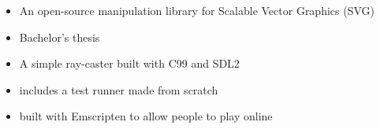\documentclass[10pt,a4paper,ragged2e,withhyper]{altacv}
\begin{document}
\begin{paracol}{2}
	\bigskip
	\medskip

	\divider

	\bigskip

	\begin{itemize}
		\item An open-source manipulation library for Scalable Vector Graphics (SVG)
		\item Bachelor's thesis
	\end{itemize}

	\divider

	\begin{itemize}
		\item A simple ray-caster built with C99 and SDL2
		\item includes a test runner made from scratch
		\item built with Emscripten to allow people to play online
	\end{itemize}
\end{paracol}
\end{document}
